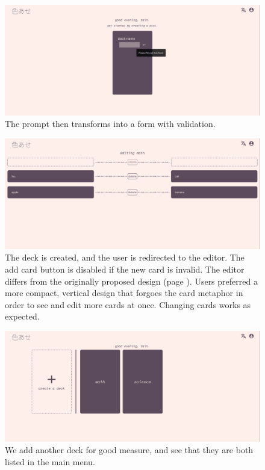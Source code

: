 \documentclass{report}
\begin{document}
\begin{figure}[H]
  \centering
  \includegraphics[width=\textwidth]{./media/evaluation/createdeck.png}
  \caption{The prompt then transforms into a form with validation.}
  \label{fig:create}
\end{figure}

\begin{figure}[H]
  \centering
  \includegraphics[width=\textwidth]{./media/evaluation/card_editor.png}
  \caption{The deck is created, and the user is redirected to the editor. The add card button is disabled if the new card is invalid. The editor differs from the originally proposed design (page \pageref{fig:editor1}). Users preferred a more compact, vertical design that forgoes the card metaphor in order to see and edit more cards at once. Changing cards works as expected.}
  \label{fig:create2}
\end{figure}

\begin{figure}[H]
  \centering
  \includegraphics[width=\textwidth]{./media/evaluation/decklist3.png}
  \caption{We add another deck for good measure, and see that they are both listed in the main menu.}
  \label{fig:decklist2}
\end{figure}
\end{document}
